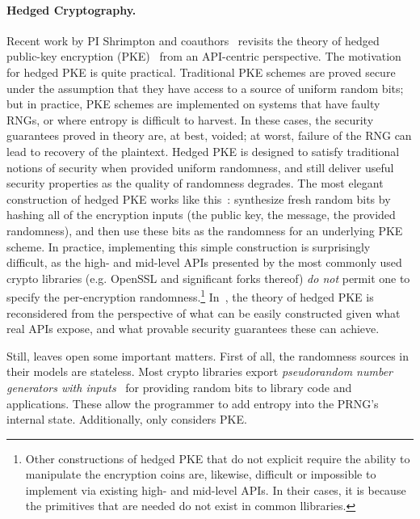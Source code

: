 \paragraph{Hedged Cryptography. }
Recent work by PI Shrimpton and coauthors~\cite{BPS} revisits the theory of
hedged public-key encryption (PKE)~\cite{BBN+} from an API-centric perspective.
%
The motivation for hedged PKE is quite practical. Traditional
PKE schemes are proved secure under the assumption that they have access to a
source of uniform random bits; but in practice, PKE schemes are implemented on
systems that have faulty RNGs, or where entropy is difficult to harvest.  In
these cases, the security guarantees proved in theory are, at best, voided; at
worst, failure of the RNG can lead to recovery of the plaintext.
%
Hedged PKE is designed to satisfy traditional notions of security when provided
uniform randomness, and still deliver useful security properties as the quality
of randomness degrades.  The most elegant construction of hedged PKE works like
this~\cite{BBN+,BH15}: synthesize fresh random bits by hashing all of the
encryption inputs (the public key, the message, the provided randomness), and
then use these bits as the randomness for an underlying PKE scheme.  In
practice, implementing this simple construction is surprisingly difficult, as
the high- and mid-level APIs presented by the most commonly used crypto
libraries (e.g. OpenSSL and significant forks thereof) \emph{do not} permit one
to specify the per-encryption randomness.\footnote{Other constructions of hedged PKE that do not explicit require the
ability to manipulate the encryption coins are, likewise, difficult or
impossible to implement via existing high- and mid-level APIs.  In
their cases, it is because the primitives that are needed do not exist
in common llibraries.}  
In~\cite{BPS}, the theory of hedged
PKE is reconsidered from the perspective of what can be easily constructed given
what real APIs expose, and what provable security guarantees these can achieve.

Still, \cite{BPS} leaves open some important matters.  First of all,
the randomness sources in their models are stateless. 
Most crypto libraries export \emph{pseudorandom number generators with
  inputs}~\cite{BH05,ST15} for providing random bits to library code and
  applications. These allow the programmer to add entropy into the PRNG's
  internal state.  
Additionally, \cite{BPS} only considers PKE.


